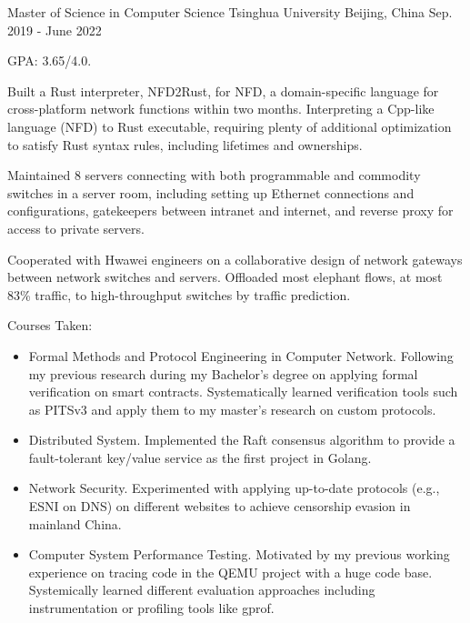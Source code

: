
\vspace{-2mm}

\begin{cventries}

  
\cventry
  {Master of Science in Computer Science} %
  {Tsinghua University} %
  {Beijing, China} %
  {Sep. 2019 - June 2022} %
  {
    \begin{cvitems} %
      \item {GPA: 3.65/4.0.}
      \item {Built a Rust interpreter, NFD2Rust, for NFD, a domain-specific language for cross-platform network functions within two months. 
      Interpreting a Cpp-like language (NFD) to Rust executable, requiring plenty of additional optimization to satisfy Rust syntax rules, including lifetimes and ownerships.
      }
      \item{Maintained 8 servers connecting with both programmable and commodity switches in a server room, including setting up Ethernet connections and configurations, gatekeepers between intranet and internet, 
      and reverse proxy for access to private servers.
      }
      \item{Cooperated with Hwawei engineers on a collaborative design of network gateways between network switches and servers. Offloaded most elephant flows, 
      at most 83\% traffic, to high-throughput switches by traffic prediction.}
      \item{Courses Taken:}
      \begin{itemize}
        \item{Formal Methods and Protocol Engineering in Computer Network.} Following my previous research during my Bachelor's degree on applying formal 
        verification on smart contracts. Systematically learned verification tools such as PITSv3 and apply them to my master's research on custom protocols.
        \item{Distributed System.} Implemented the Raft consensus algorithm to provide a fault-tolerant key/value service as the first project in Golang.
        \item{Network Security.} Experimented with applying up-to-date protocols (e.g., ESNI on DNS) on different websites to achieve censorship evasion 
        in mainland China.
        \item{Computer System Performance Testing.} Motivated by my previous working experience on tracing code in the QEMU project with a huge code base.
        Systemically learned different evaluation approaches including instrumentation or profiling tools like gprof.
			\end{itemize}
    \end{cvitems}
  }


\end{cventries}
